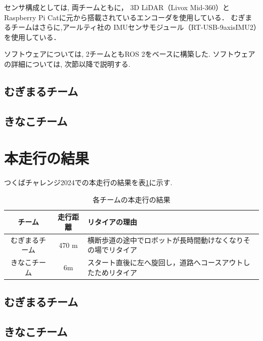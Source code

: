 \documentclass[twocolumn,9pt]{jsproceedings}
\begin{document}
センサ構成としては, 両チームともに，
3D LiDAR（Livox Mid-360）と
Raspberry Pi Catに元から搭載されているエンコーダを使用している．
むぎまるチームはさらに,アールティ社の 
IMUセンサモジュール（RT-USB-9axisIMU2\cite{RTshopIMU}）を使用している．

ソフトウェアについては, 
2チームともROS 2\cite{ROS 2}をベースに構築した. 
ソフトウェアの詳細については, 
次節以降で説明する. 


\subsection{むぎまるチーム}



\subsection{きなこチーム}\label{sub:localization}



\section{本走行の結果}

つくばチャレンジ2024での本走行の結果を表\ref{MainRun}に示す. 

\begin{table}[H]
  \caption{各チームの本走行の結果}
  \label{MainRun}
  \begin{tabular}{|c|c|p{4.0cm}|}
    \hline
    チーム         & 走行距離 & リタイアの理由\\
    \hline
    むぎまるチーム & 470 m    & 横断歩道の途中でロボットが長時間動けなくなりその場でリタイア\\
    \hline

    きなこチーム　 & 6m    & スタート直後に左へ旋回し，道路へコースアウトしたためリタイア \\
    \hline
  \end{tabular}
\end{table}

\subsection{むぎまるチーム}


\subsection{きなこチーム}

\end{document}
